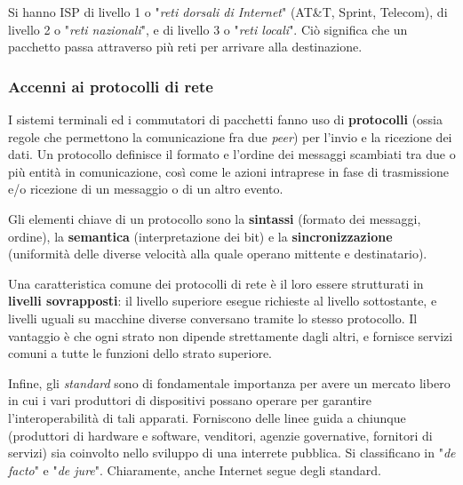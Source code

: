 \vspace{3mm}

Si hanno ISP di livello 1 o "\textit{reti dorsali di Internet}" (AT\&T, Sprint, Telecom), di livello 2 o "\textit{reti nazionali}", e di livello 3 o "\textit{reti locali}". Ciò significa che un pacchetto passa attraverso più reti per arrivare alla destinazione.

\subsubsection{Accenni ai protocolli di rete}

\vspace{3mm}

I sistemi terminali ed i commutatori di pacchetti fanno uso di \textbf{protocolli} (ossia regole che permettono la comunicazione fra due \textit{peer}) per l’invio e la ricezione dei dati. Un protocollo definisce il formato e l’ordine dei messaggi scambiati tra due o più entità in comunicazione, così come le azioni intraprese in fase di trasmissione e/o ricezione di un messaggio o di un altro evento.

\vspace{3mm}

Gli elementi chiave di un protocollo sono la \textbf{sintassi} (formato dei messaggi, ordine), la \textbf{semantica} (interpretazione dei bit) e la \textbf{sincronizzazione} (uniformità delle diverse velocità alla quale operano mittente e destinatario).

\vspace{3mm}

Una caratteristica comune dei protocolli di rete è il loro essere strutturati in \textbf{livelli sovrapposti}: il livello superiore esegue richieste al livello sottostante, e livelli uguali su macchine diverse conversano tramite lo stesso protocollo. Il vantaggio è che ogni strato non dipende strettamente dagli altri, e fornisce servizi comuni a tutte le funzioni dello strato superiore. 

\vspace{3mm}

Infine, gli \textit{standard} sono di fondamentale importanza per avere un mercato libero in cui i vari produttori di dispositivi possano operare per garantire l’interoperabilità di tali apparati. Forniscono delle linee guida a chiunque (produttori di hardware e software, venditori, agenzie governative, fornitori di servizi) sia coinvolto nello sviluppo di una interrete pubblica. Si classificano in "\textit{de facto}" e "\textit{de jure}". Chiaramente, anche Internet segue degli standard.

